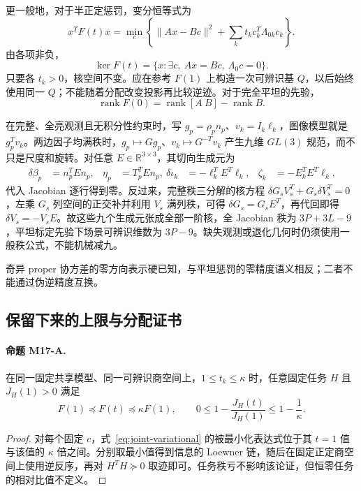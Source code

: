 更一般地，对于半正定惩罚，变分恒等式为
\begin{equation}
 x^TF(t)x=\min_c\left\{\|Ax-Bc\|^2+
                          \sum_k t_kc_k^T\Lambda_{0k}c_k\right\}.
 \label{eq:joint-variational}
\end{equation}
由各项非负，
\begin{equation}
 \ker F(t)=\{x:\exists c,\ Ax=Bc,\ \Lambda_0c=0\}.
\end{equation}
只要各 $t_k>0$，核空间不变。应在参考 $F(1)$ 上构造一次可辨识基 $Q$，以后始终使用同一 $Q$；不能随着分配改变投影再比较逆迹。对于完全平坦的先验，
\begin{equation}
 \operatorname{rank}F(0)=\operatorname{rank}[A\ B]-\operatorname{rank}B.
\end{equation}

在完整、全亮观测且无积分性约束时，写 $g_p=\rho_pn_p$、$v_k=I_k\ell_k$，图像模型就是 $g_p^Tv_k$。两边因子均满秩时，$g_p\mapsto Gg_p$、$v_k\mapsto G^{-T}v_k$ 产生九维 $GL(3)$ 规范，而不只是尺度和旋转。对任意 $E\in\mathbb R^{3\times3}$，其切向生成元为
\begin{align}
 \delta\beta_p&=n_p^TEn_p,& \eta_p&=T_p^TEn_p,\
 \delta\iota_k&=-\ell_k^TE^T\ell_k,&
 \zeta_k&=-E_k^TE^T\ell_k.
\end{align}
代入 Jacobian 逐行得到零。反过来，完整秩三分解的核方程
$\delta G_sV_s^T+G_s\delta V_s^T=0$，左乘 $G_s$ 列空间的正交补并利用 $V_s$ 满列秩，可得 $\delta G_s=G_sE^T$，再代回即得 $\delta V_s=-V_sE$。故这些九个生成元张成全部一阶核，全 Jacobian 秩为 $3P+3L-9$，平坦标定先验下场景可辨识维数为 $3P-9$。缺失观测或退化几何时仍须使用一般秩公式，不能机械减九。

奇异 proper 协方差的零方向表示硬已知，与平坦惩罚的零精度语义相反；二者不能通过伪逆精度互换。

\subsection{保留下来的上限与分配证书}

\paragraph{命题 M17-A.}
在同一固定共享模型、同一可辨识商空间上，$1\le t_k\le\kappa$ 时，任意固定任务 $H$ 且 $J_H(1)>0$ 满足
\begin{equation}
 F(1)\preceq F(t)\preceq\kappa F(1),\qquad
 0\le1-\frac{J_H(t)}{J_H(1)}\le1-\frac1\kappa.
\end{equation}
\begin{proof}
对每个固定 $c$，式~\eqref{eq:joint-variational} 的被最小化表达式位于其 $t=1$ 值与该值的 $\kappa$ 倍之间。分别取最小值得到信息的 Loewner 链，随后在固定正定商空间上使用逆反序，再对 $H^TH\succeq0$ 取迹即可。任务秩亏不影响该论证，但恒零任务的相对比值不定义。
\end{proof}

